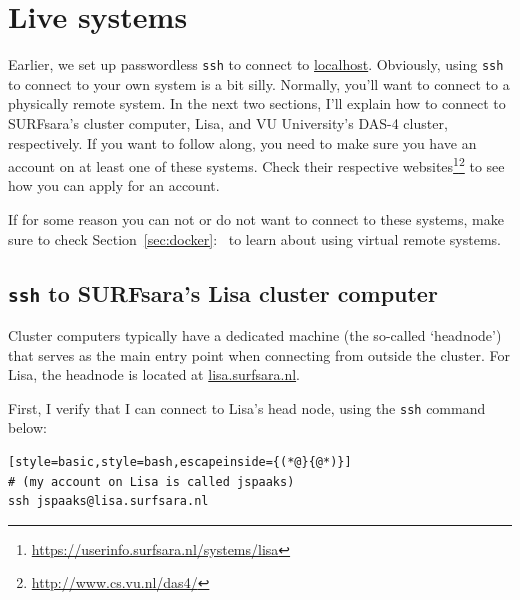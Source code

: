 \documentclass[12pt, a4paper, twoside, openany, titlepage]{book}
\begin{document}
\section{Live systems}
\label{sec:live-systems}

Earlier, we set up passwordless \texttt{ssh} to connect to \url{localhost}. Obviously, using \texttt{ssh} to connect to your own system is a bit silly. Normally, you'll want to connect to a physically remote system. In the next two sections, I'll explain how to connect to SURFsara's cluster computer, Lisa, and VU University's DAS-4 cluster, respectively. If you want to follow along, you need to make sure you have an account on at least one of these systems. Check their respective websites\footnote{\url{https://userinfo.surfsara.nl/systems/lisa}}\footnote{\url{http://www.cs.vu.nl/das4/}} to see how you can apply for an account.

If for some reason you can not or do not want to connect to these systems, make sure to check Section~\ref{sec:docker}:~\textit{} to learn about using virtual remote systems.

\subsection{\texttt{ssh} to SURFsara's Lisa cluster computer}

Cluster computers typically have a dedicated machine (the so-called `headnode') that serves as the main entry point when connecting from outside the cluster. For Lisa, the headnode is located at \url{lisa.surfsara.nl}.

First, I verify that I can connect to Lisa's head node, using the \texttt{ssh} command below:
\begin{lstlisting}[style=basic,style=bash,escapeinside={(*@}{@*)}]
# (my account on Lisa is called jspaaks)
ssh jspaaks@lisa.surfsara.nl
\end{lstlisting}
\end{document}
